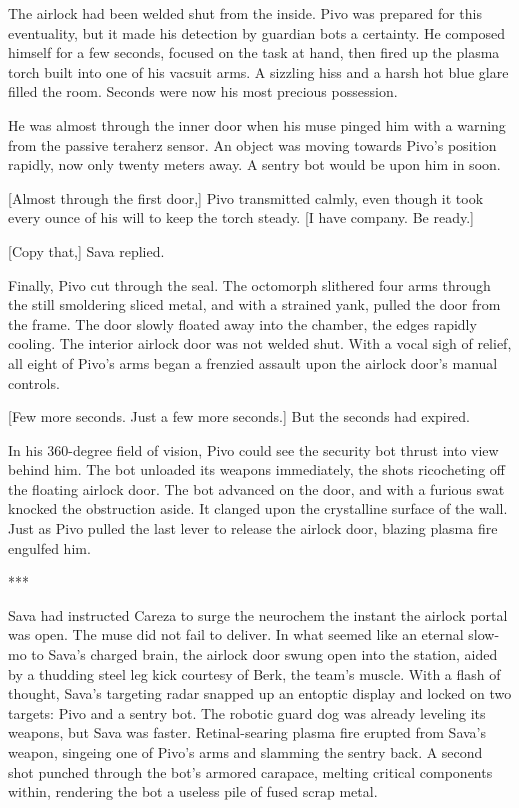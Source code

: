 The airlock had been welded shut from the inside. Pivo was prepared for this eventuality, but it made his detection by guardian bots a certainty. He composed himself for a few seconds, focused on the task at hand, then fired up the plasma torch built into one of his vacsuit arms. A sizzling hiss and a harsh hot blue glare filled the room. Seconds were now his most precious possession.

He was almost through the inner door when his muse pinged him with a warning from the passive teraherz sensor. An object was moving towards Pivo's position rapidly, now only twenty meters away. A sentry bot would be upon him in soon.

[Almost through the first door,] Pivo transmitted calmly, even though it took every ounce of his will to keep the torch steady. [I have company. Be ready.]

[Copy that,] Sava replied.

Finally, Pivo cut through the seal. The octomorph slithered four arms through the still smoldering sliced metal, and with a strained yank, pulled the door from the frame. The door slowly floated away into the chamber, the edges rapidly cooling. The interior airlock door was not welded shut. With a vocal sigh of relief, all eight of Pivo's arms began a frenzied assault upon the airlock door's manual controls.

[Few more seconds. Just a few more seconds.] But the seconds had expired.

In his 360-degree field of vision, Pivo could see the security bot thrust into view behind him. The bot unloaded its weapons immediately, the shots ricocheting off the floating airlock door. The bot advanced on the door, and with a furious swat knocked the obstruction aside. It clanged upon the crystalline surface of the wall. Just as Pivo pulled the last lever to release the airlock door, blazing plasma fire engulfed him.

\begin{center} *** \end{center}

Sava had instructed Careza to surge the neurochem the instant the airlock portal was open. The muse did not fail to deliver. In what seemed like an eternal slow-mo to Sava's charged brain, the airlock door swung open into the station, aided by a thudding steel leg kick courtesy of Berk, the team's muscle. With a flash of thought, Sava's targeting radar snapped up an entoptic display and locked on two targets: Pivo and a sentry bot. The robotic guard dog was already leveling its weapons, but Sava was faster. Retinal-searing plasma fire erupted from Sava's weapon, singeing one of Pivo's arms and slamming the sentry back. A second shot punched through the bot's armored carapace, melting critical components within, rendering the bot a useless pile of fused scrap metal.

